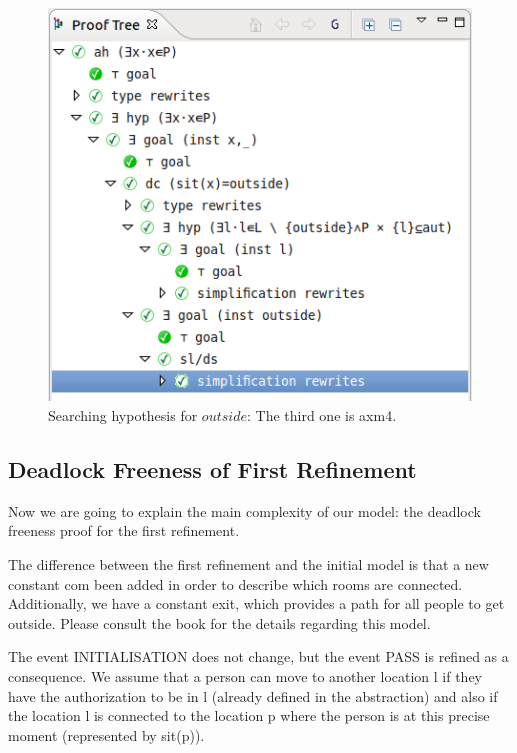 \begin{figure}[!ht]
  \begin{center}
    \includegraphics{img/tutorial/tut_10_proof_tree_final.png}
    \caption{Searching hypothesis for $outside$: The third one is \textsf{axm4}.}
    \label{fig_tut_10_final_proof_tree}
  \end{center}
\end{figure}



\subsection{Deadlock Freeness of First Refinement}
\label{tut_location_first_refinement}

Now we are going to explain the main complexity of our model: the deadlock freeness proof for the first refinement. 


The difference between the first refinement and the initial model is that a new constant \textsf{com} been added in order to describe which rooms are connected. Additionally, we have a constant \textsf{exit}, which provides a path for all people to get outside.  Please consult the book for the details regarding this model.

The event \textsf{INITIALISATION} does not change, but the event \textsf{PASS} is refined as a consequence. We assume that a person can move to another location l if they have the authorization to be in l (already defined in the abstraction) and also if the location l is connected to the location p where the person is at this precise moment (represented by sit(p)).


